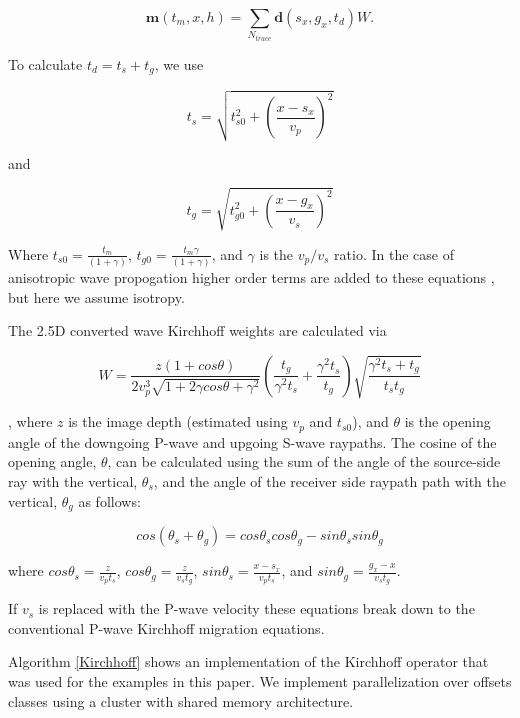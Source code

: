\begin{equation}
\mathbf{m}(t_m,x,h)=\sum\limits_{N_{trace}}\mathbf{d}(s_x,g_x,t_d)W.
\end{equation}

To calculate $t_d = t_s + t_g$, we use 

\begin{equation}
t_s = \sqrt{t_{s0}^2 + (\frac{x-s_x}{v_p})^2} 
\end{equation}

and 

\begin{equation}
t_g = \sqrt{t_{g0}^2 + (\frac{x-g_x}{v_s})^2 } 
\end{equation}

Where $t_{s0} = \frac{t_m}{(1+\gamma)}$, $t_{g0} = \frac{t_m\gamma}{(1+\gamma)}$, and $\gamma$ is the $v_p/v_s$ ratio. In the case of anisotropic wave propogation higher order terms are added to these equations \citep{shaowu2013}, but here we assume isotropy.

The 2.5D converted wave Kirchhoff weights are calculated via

\begin{equation}
W=\frac{z(1+cos\theta)}{2v_p^3\sqrt{1+2\gamma cos\theta + \gamma^2}} (\frac{t_g}{\gamma ^2 t_s} + \frac{\gamma^2t_s}{t_g}) \sqrt{\frac{\gamma^2t_s + t_g}{t_st_g}}
\end{equation}

\citep{cary2011}, where $z$ is the image depth (estimated using $v_p$ and $t_{s0}$), and $\theta$ is the opening angle of the downgoing P-wave and upgoing S-wave raypaths. The cosine of the opening angle, $\theta$, can be calculated using the sum of the angle of the source-side ray with the vertical, $\theta_s$, and the angle of the receiver side raypath path with the vertical, $\theta_g$ as follows:

\begin{equation}
cos(\theta_s + \theta_g)=cos\theta_s cos\theta_g - sin\theta_s sin\theta_g
\end{equation}

where $cos\theta_s = \frac{z}{v_p t_s}$, $cos\theta_g = \frac{z}{v_s t_g}$, $sin\theta_s = \frac{x-s_x}{v_p t_s}$, and $sin\theta_g = \frac{g_x-x}{v_s t_g}$.

If $v_s$ is replaced with the P-wave velocity these equations break down to the conventional P-wave Kirchhoff migration equations.

Algorithm \ref{Kirchhoff} shows an implementation of the Kirchhoff operator that was used for the examples in this paper. We implement parallelization over offsets classes using a cluster with shared memory architecture. 

